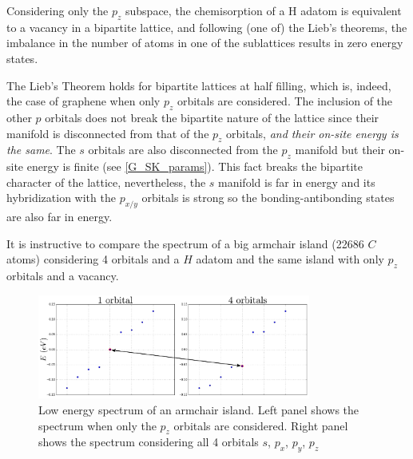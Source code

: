 Considering only the $p_z$ subspace, the chemisorption of a H adatom is equivalent to a vacancy in a bipartite lattice, and following (one of) the Lieb's theorems\cite{Lieb1989}, the imbalance in the number of atoms in one of the sublattices results in zero energy states.

The Lieb's Theorem holds for bipartite lattices at half filling, which is, indeed, the case of graphene when only $p_z$ orbitals are considered. The inclusion of the other $p$ orbitals does not break the bipartite nature of the lattice since their manifold is disconnected from that of the $p_z$ orbitals, \emph{and their on-site energy is the same}.
The $s$ orbitals are also disconnected from the $p_z$ manifold but their on-site energy is finite (see \ref{G_SK_params}). This fact breaks the bipartite character of the lattice, nevertheless, the $s$ manifold is far in energy and its hybridization with the $p_{x/y}$ orbitals is strong so the bonding-antibonding states are also far in energy.




It is instructive to compare the spectrum of a big armchair island (22686
$C$ atoms) considering 4 orbitals and a $H$ adatom and the same island with only $p_z$ orbitals and a vacancy.

\begin{figure}[h!]
  \centering
  \includegraphics[width=0.8\textwidth]{defects/fig/spectrum.pdf}
  \vspace{-5pt}
\caption{Low energy spectrum of an armchair island. Left panel shows the spectrum when only the $p_z$ orbitals are considered. Right panel shows the spectrum considering all 4 orbitals $s$, $p_x$, $p_y$, $p_z$}
\label{spectrum}
\end{figure}
\FloatBarrier

